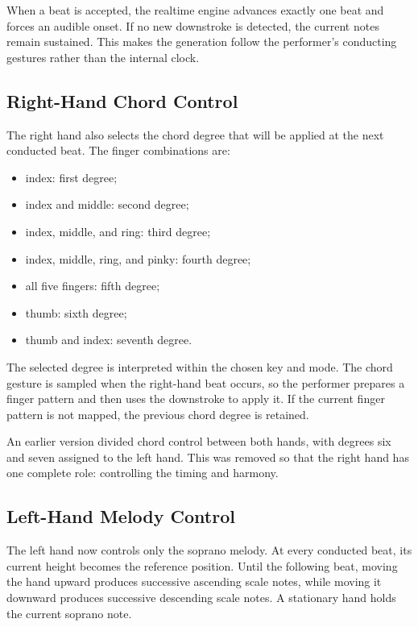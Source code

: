 \documentclass[11pt,a4paper]{article}
\begin{document}
When a beat is accepted, the realtime engine advances exactly one beat and
forces an audible onset. If no new downstroke is detected, the current notes
remain sustained. This makes the generation follow the performer's conducting
gestures rather than the internal clock.

\subsection{Right-Hand Chord Control}

The right hand also selects the chord degree that will be applied at the next
conducted beat. The finger combinations are:

\begin{itemize}
    \item index: first degree;
    \item index and middle: second degree;
    \item index, middle, and ring: third degree;
    \item index, middle, ring, and pinky: fourth degree;
    \item all five fingers: fifth degree;
    \item thumb: sixth degree;
    \item thumb and index: seventh degree.
\end{itemize}

The selected degree is interpreted within the chosen key and mode. The chord
gesture is sampled when the right-hand beat occurs, so the performer prepares
a finger pattern and then uses the downstroke to apply it. If the current
finger pattern is not mapped, the previous chord degree is retained.

An earlier version divided chord control between both hands, with degrees six
and seven assigned to the left hand. This was removed so that the right hand
has one complete role: controlling the timing and harmony.

\subsection{Left-Hand Melody Control}

The left hand now controls only the soprano melody. At every conducted beat,
its current height becomes the reference position. Until the following beat,
moving the hand upward produces successive ascending scale notes, while moving
it downward produces successive descending scale notes. A stationary hand
holds the current soprano note.
\end{document}

